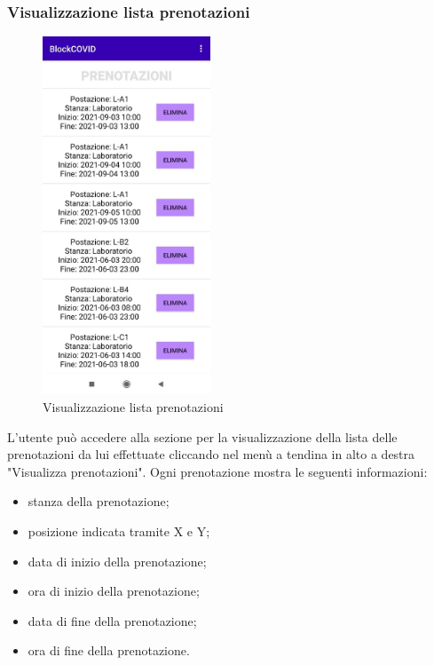 	\subsubsection{Visualizzazione lista prenotazioni}
	\begin{figure}[H]
		\centering
		\includegraphics[width=5cm]{res/images/listaPrenotazioni.png}
		\caption{Visualizzazione lista prenotazioni}
	\end{figure}
	L’utente può accedere alla sezione per la visualizzazione della lista delle prenotazioni da lui effettuate cliccando nel menù a tendina in alto a destra "Visualizza prenotazioni".
	Ogni prenotazione mostra le seguenti informazioni:
	\begin{itemize}
		\item stanza della prenotazione;
		\item posizione indicata tramite X e Y;
		\item data di inizio della prenotazione;
		\item ora di inizio della prenotazione;
		\item data di fine della prenotazione;
		\item ora di fine della prenotazione.
	\end{itemize}
